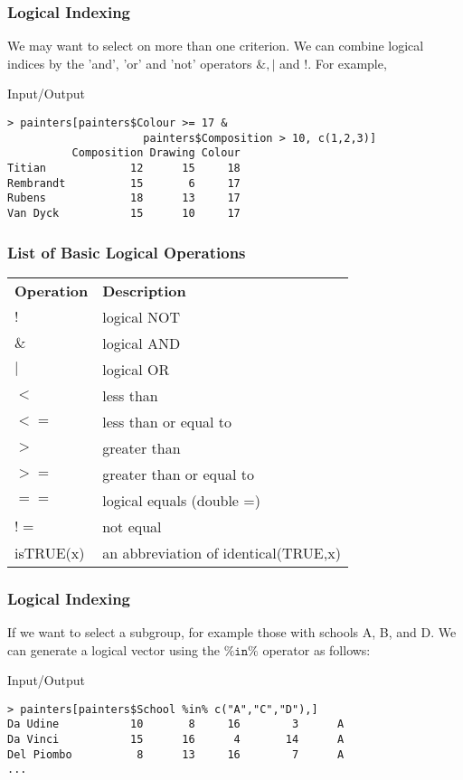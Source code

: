\documentclass[xcolor={table},c]{beamer}
\begin{document}
\begin{frame}[fragile]\frametitle{Logical Indexing}
We may want to select on more than one criterion. We can combine logical indices by the 'and', 'or' and 'not' operators $\mathtt{\&,  | }$ and $\mathtt{!}$. For example,
\begin{exampleblock}{Input/Output}
\begin{verbatim}
> painters[painters$Colour >= 17 & 
                     painters$Composition > 10, c(1,2,3)]
          Composition Drawing Colour
Titian             12      15     18
Rembrandt          15       6     17
Rubens             18      13     17
Van Dyck           15      10     17
\end{verbatim}
\end{exampleblock}
\end{frame}


\begin{frame}[fragile]\frametitle{List of Basic Logical Operations}
  \begin{tabular}{@{} >{\ttfamily}l p{7cm}} 
    \rowcolor{gray!40}
    \textbf{Operation} & \textbf{Description}\\
$!$ &        logical NOT                         \\
$\&$ &       logical AND                         \\
$|$ &       logical OR                          \\
$<$ &        less than                           \\
$<=$ &       less than or equal to               \\
$>$ &        greater than                        \\
$>=$ &       greater than or equal to            \\
$==$ &       logical equals (double =)           \\
$!=$ &       not equal                           \\
isTRUE(x) & an abbreviation of identical(TRUE,x)\\
\end{tabular}
\end{frame}


\begin{frame}[fragile]\frametitle{Logical Indexing}
If we want to select a subgroup, for example those with schools A, B, and D. We can generate
 a logical vector using the  $\mathtt{\%in\%}$ operator as follows:
\begin{exampleblock}{Input/Output}\small
\begin{verbatim}
> painters[painters$School %in% c("A","C","D"),]
Da Udine           10       8     16        3      A
Da Vinci           15      16      4       14      A
Del Piombo          8      13     16        7      A
...
\end{verbatim}
\end{exampleblock}
\end{frame}
\end{document}
